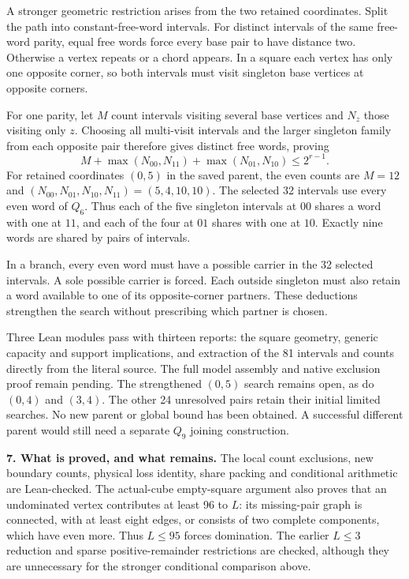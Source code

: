 \documentclass[11pt,a4paper]{article}
\begin{document}
A stronger geometric restriction arises from the two retained
coordinates. Split the path into constant-free-word intervals.
For distinct intervals of the same free-word parity, equal free
words force every base pair to have distance two. Otherwise a
vertex repeats or a chord appears. In a square each vertex has
only one opposite corner, so both intervals must visit singleton
base vertices at opposite corners.

For one parity, let $M$ count intervals visiting several base
vertices and $N_z$ those visiting only $z$. Choosing all multi-visit
intervals and the larger singleton family from each opposite pair
therefore gives distinct free words, proving
\[
M+\max(N_{00},N_{11})+\max(N_{01},N_{10})\le 2^{r-1}.
\]
For retained coordinates $(0,5)$ in the saved parent, the even
counts are $M=12$ and $(N_{00},N_{01},N_{10},N_{11})=(5,4,10,10)$.
The selected 32 intervals use every even word of $Q_6$.
Thus each of the five singleton intervals at $00$ shares a word
with one at $11$, and each of the four at $01$ shares with one at
$10$. Exactly nine words are shared by pairs of intervals.

In a branch, every even word must have a possible carrier in the
32 selected intervals. A sole possible carrier is forced. Each
outside singleton must also retain a word available to one of its
opposite-corner partners. These deductions strengthen the search
without prescribing which partner is chosen.

Three Lean modules pass with thirteen reports: the square geometry,
generic capacity and support implications, and extraction of the
81 intervals and counts directly from the literal source. The full
model assembly and native exclusion proof remain pending.
The strengthened $(0,5)$ search remains open, as do $(0,4)$ and
$(3,4)$. The other 24 unresolved pairs retain their initial limited
searches. No new parent or global bound has been obtained.
A successful different parent would still need a separate $Q_9$
joining construction.

\textbf{7. What is proved, and what remains.}
The local count exclusions, new boundary counts, physical loss identity,
share packing and conditional arithmetic are Lean-checked. The actual-cube
empty-square argument also proves that an undominated vertex contributes
at least 96 to $L$: its missing-pair graph is connected, with at least
eight edges, or consists of two complete components, which have even more.
Thus $L\le95$ forces domination. The earlier $L\le3$ reduction and sparse
positive-remainder restrictions are checked, although they are unnecessary
for the stronger conditional comparison above.
\end{document}
